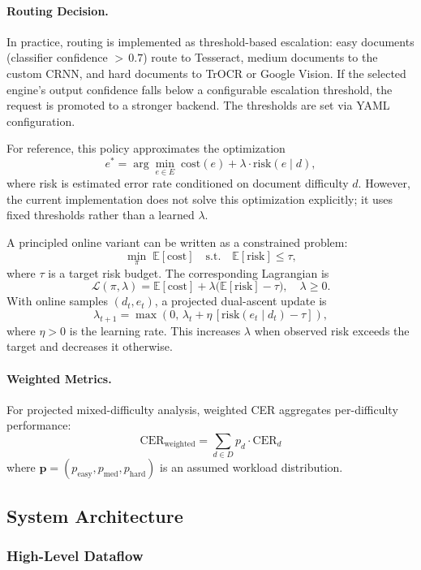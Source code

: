 \documentclass[12pt,a4paper]{article}
\begin{document}
\paragraph{Routing Decision.}
In practice, routing is implemented as threshold-based escalation:
easy documents (classifier confidence ${>}\,0.7$) route to
Tesseract, medium documents to the custom CRNN, and hard documents to
TrOCR or Google Vision. If the selected engine's output confidence
falls below a configurable escalation threshold, the request is
promoted to a stronger backend. The thresholds are set via YAML
configuration.

For reference, this policy approximates the optimization
\[
  e^* = \arg\min_{e \in E}\; \text{cost}(e) +
  \lambda \cdot \text{risk}(e \mid d),
\]
where risk is estimated error rate conditioned on document difficulty
$d$. However, the current implementation does not solve this
optimization explicitly; it uses fixed thresholds rather than a
learned $\lambda$.

A principled online variant can be written as a constrained problem:
\[
  \min_{\pi}\; \mathbb{E}[\text{cost}] \quad
  \text{s.t.} \quad \mathbb{E}[\text{risk}] \le \tau,
\]
where $\tau$ is a target risk budget. The corresponding Lagrangian is
\[
  \mathcal{L}(\pi, \lambda) =
  \mathbb{E}[\text{cost}] +
  \lambda\big(\mathbb{E}[\text{risk}] - \tau\big),
  \quad \lambda \ge 0.
\]
With online samples $(d_t, e_t)$, a projected dual-ascent update is
\[
  \lambda_{t+1} =
  \max\!\left(0,\, \lambda_t + \eta\,[\text{risk}(e_t \mid d_t) - \tau]\right),
\]
where $\eta > 0$ is the learning rate. This increases $\lambda$ when
observed risk exceeds the target and decreases it otherwise.

\paragraph{Weighted Metrics.}
For projected mixed-difficulty analysis, weighted CER aggregates
per-difficulty performance:
$$
  \text{CER}_{\text{weighted}} =
  \sum_{d \in D} p_d \cdot \text{CER}_d
$$
where $\mathbf{p} = (p_{\text{easy}}, p_{\text{med}},
p_{\text{hard}})$ is an assumed workload distribution.

\subsection{System Architecture}

\subsubsection{High-Level Dataflow}
\end{document}
